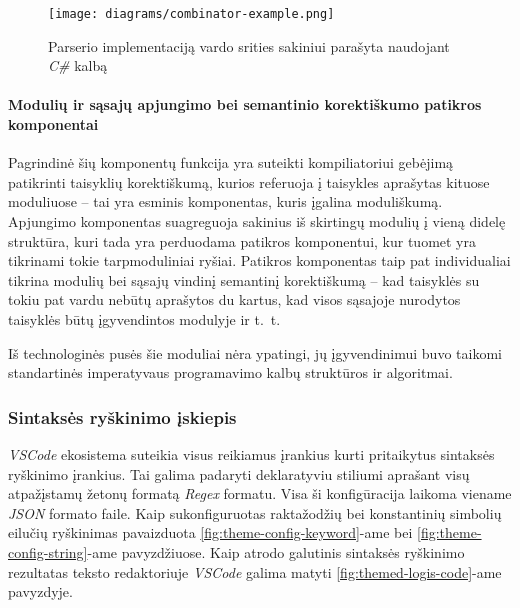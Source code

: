 \begin{activities}
{        \begin{figure}
            \centering
            \texttt{[image: diagrams/combinator-example.png]}
            \caption{Parserio implementaciją vardo srities sakiniui parašyta naudojant \textit{C\#} kalbą}
            \label{fig:combinator-example}
        \end{figure}

        \newpage

        \paragraph{Modulių ir sąsajų apjungimo bei semantinio korektiškumo patikros komponentai}

        Pagrindinė šių komponentų funkcija yra suteikti kompiliatoriui gebėjimą patikrinti taisyklių korektiškumą, kurios referuoja į taisykles aprašytas kituose moduliuose -- tai yra esminis komponentas, kuris įgalina moduliškumą. Apjungimo komponentas suagreguoja sakinius iš skirtingų modulių į vieną didelę struktūra, kuri tada yra perduodama patikros komponentui, kur tuomet yra tikrinami tokie tarpmoduliniai ryšiai. Patikros komponentas taip pat individualiai tikrina modulių bei sąsajų vindinį semantinį korektiškumą -- kad taisyklės su tokiu pat vardu nebūtų aprašytos du kartus, kad visos sąsajoje nurodytos taisyklės būtų įgyvendintos modulyje ir \hbox{t. t.}

        Iš technologinės pusės šie moduliai nėra ypatingi, jų įgyvendinimui buvo taikomi standartinės imperatyvaus programavimo kalbų struktūros ir algoritmai.
    
        \subsubsection*{Sintaksės ryškinimo įskiepis}

        \textit{VSCode} ekosistema suteikia visus reikiamus įrankius kurti pritaikytus sintaksės ryškinimo įrankius. Tai galima padaryti deklaratyviu stiliumi aprašant visų atpažįstamų žetonų formatą \textit{Regex} formatu. Visa ši konfigūracija laikoma viename \textit{JSON} formato faile. Kaip sukonfiguruotas raktažodžių bei konstantinių simbolių eilučių ryškinimas pavaizduota \ref{fig:theme-config-keyword}-ame bei \ref{fig:theme-config-string}-ame pavyzdžiuose. Kaip atrodo galutinis sintaksės ryškinimo rezultatas teksto redaktoriuje \textit{VSCode} galima matyti \ref{fig:themed-logis-code}-ame pavyzdyje.

}
\end{activities}
